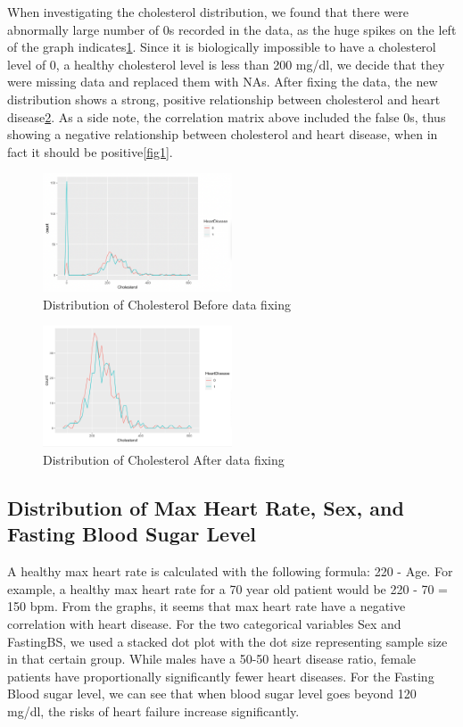\documentclass{article}
\begin{document}
When investigating the cholesterol distribution, we found that there were abnormally large number of 0s recorded in the data, as the huge spikes on the left of the graph indicates\ref{fig4}. Since it is biologically impossible to have a cholesterol level of 0, a healthy cholesterol level is less than 200 mg/dl, we decide that they were missing data and replaced them with NAs. After fixing the data, the new distribution shows a strong, positive relationship between cholesterol and heart disease\ref{fig5}. As a side note, the correlation matrix above included the false 0s, thus showing a negative relationship between cholesterol and heart disease, when in fact it should be positive\ref{fig1}. 

\begin{figure}[h]
	\centering
	\includegraphics[width=0.5\textwidth]{images/dist3.PNG}
	\caption{Distribution of Cholesterol Before data fixing}
	\label{fig4}
\end{figure}

\begin{figure}[h]
	\centering
	\includegraphics[width=0.5\textwidth]{images/dist4.PNG}
	\caption{Distribution of Cholesterol After data fixing}
	\label{fig5}
\end{figure}

\subsection {Distribution of Max Heart Rate, Sex, and Fasting Blood Sugar Level}

A healthy max heart rate is calculated with the following formula: 220 - Age. For example, a healthy max heart rate for a 70 year old patient would be 220 - 70 = 150 bpm. From the graphs, it seems that max heart rate have a negative correlation with heart disease. For the two categorical variables Sex and FastingBS, we used a stacked dot plot with the dot size representing sample size in that certain group. While males have a 50-50 heart disease ratio, female patients have proportionally significantly fewer heart diseases. For the Fasting Blood sugar level, we can see that when blood sugar level goes beyond 120 mg/dl, the risks of heart failure increase significantly.
\end{document}
